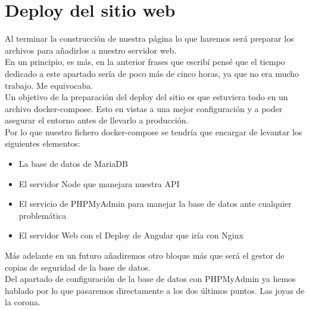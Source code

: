 \chapter{Deploy del sitio web}
Al terminar la construcción de nuestra página lo que haremos será preparar los archivos para añadirlos a nuestro servidor web.
\\En un principio, es más, en la anterior frases que escribí pensé que el tiempo dedicado a este apartado sería de poco más de cinco horas, ya que no era mucho trabajo. Me equivocaba.
\\Un objetivo de la preparación del deploy del sitio es que estuviera todo en un archivo docker-compose. Esto en vistas a una mejor configuración y a poder asegurar el entorno antes de llevarlo a producción.
\\Por lo que nuestro fichero docker-compose se tendría que encargar de levantar los siguientes elementos:

\begin{itemize}
    \item La base de datos de MariaDB
    \item El servidor Node que manejara nuestra API
    \item El servicio de PHPMyAdmin para manejar la base de datos ante cualquier problemática
    \item El servidor Web con el Deploy de Angular que iría con Nginx
\end{itemize}

Más adelante en un futuro añadiremos otro bloque más que será el gestor de copias de seguridad de la base de datos.
\\Del apartado de configuración de la base de datos con PHPMyAdmin ya hemos hablado por lo que pasaremos directamente a los dos últimos puntos. Las joyas de la corona.


